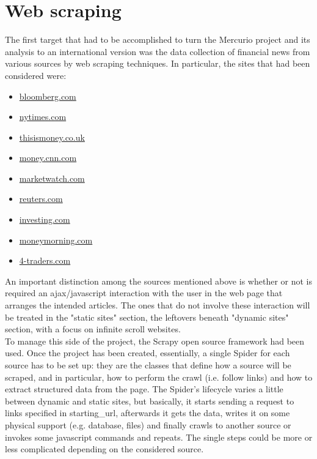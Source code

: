 \section{Web scraping}
The first target that had to be accomplished to turn the Mercurio project and its analysis to an international version was the data collection of financial news from various sources by web scraping techniques. In particular, the sites that had been considered were: 
\begin{itemize}
\item \href{https://www.bloomberg.com}{bloomberg.com}
\item \href{https://www.nytimes.com}{nytimes.com}
\item \href{https://www.thisismoney.co.uk}{thisismoney.co.uk}
\item \href{http://money.cnn.com}{money.cnn.com}
\item \href{http://www.marketwatch.com}{marketwatch.com}
\item \href{http://www.reuters.com}{reuters.com}
\item \href{http://www.investing.com}{investing.com}
\item \href{http://www.moneymorning.com}{moneymorning.com} 
\item \href{http://www.4-traders.com/}{4-traders.com}
\end{itemize}
An important distinction among the sources mentioned above is whether or not is required an ajax/javascript interaction with the user in the web page that arranges the intended articles. The ones that do not involve these interaction will be treated in the "static sites" section, the leftovers beneath "dynamic sites" section, with a focus on infinite scroll websites. \\ 
To manage this side of the project, the Scrapy open source framework \cite{scrapyframework} had been used. %
Once the project has been created, essentially, a single Spider \cite{scrapyspider} for each source has to be set up: they are the classes that define how a source will be scraped, and in particular, how to perform the crawl (i.e. follow links) and how to extract structured data from the page. The Spider's lifecycle varies a little between dynamic and static sites, but basically, it starts sending a request to links specified in starting\_url, afterwards it gets the data, writes it on some physical support (e.g. database, files) and finally crawls to another source or invokes some javascript commands and repeats. The single steps could be more or less complicated depending on the considered source. \\
